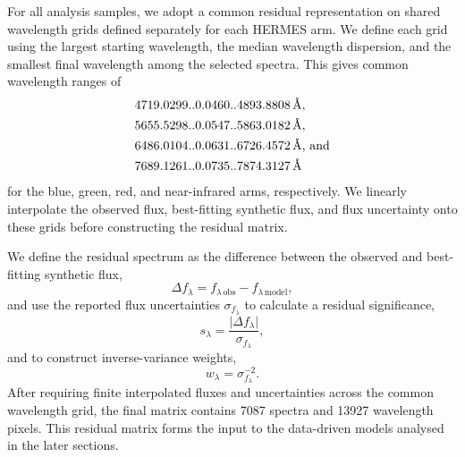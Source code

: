 \documentclass[twocolumn,apj,numberedappendix,appendixfloats]{openjournal}
\begin{document}
For all analysis samples, we adopt a common residual representation on shared wavelength grids defined separately for each HERMES arm. We define each grid using the largest starting wavelength, the median wavelength dispersion, and the smallest final wavelength among the selected spectra. This gives common wavelength ranges of
\begin{align}
    4719.0299..&0.0460..4893.8808\,\text{\AA}, \notag \\
    5655.5298..&0.0547..5863.0182\,\text{\AA}, \notag \\
    6486.0104..&0.0631..6726.4572\,\text{\AA}\text{, and} \notag \\
    7689.1261..&0.0735..7874.3127\,\text{\AA} \notag
\end{align}
for the blue, green, red, and near-infrared arms, respectively. We linearly interpolate the observed flux, best-fitting synthetic flux, and flux uncertainty onto these grids before constructing the residual matrix.

We define the residual spectrum as the difference between the observed and best-fitting synthetic flux,
\begin{equation}
    \Delta f_\lambda = f_{\lambda\,\mathrm{obs}} - f_{\lambda\,\mathrm{model}}, \label{eq:def_residuals}
\end{equation}
and use the reported flux uncertainties $\sigma_{f_\lambda}$ to calculate a residual significance,
\begin{equation}
    s_\lambda = \frac{\vert \Delta f_\lambda \vert}{\sigma_{f_\lambda}}, \label{eq:def_significance}
\end{equation}
and to construct inverse-variance weights,
\begin{equation}
    w_\lambda = \sigma_{f_\lambda}^{-2}. \label{eq:def_ivar}
\end{equation}
After requiring finite interpolated fluxes and uncertainties across the common wavelength grid, the final matrix contains 7087 spectra and 13927 wavelength pixels. This residual matrix forms the input to the data-driven models analysed in the later sections.
\end{document}
